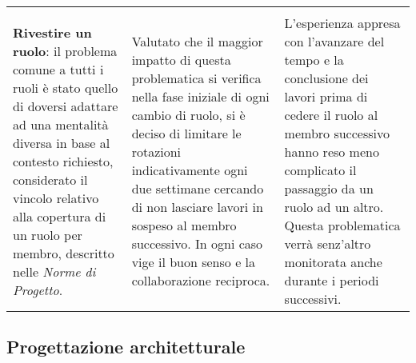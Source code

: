 \begin{longtable}{ 
				>{\centering}p{}
				>{\centering}p{}
				>{\centering\arraybackslash}p{}}
				\multicolumn{3}{c}{Ruoli} \\
				\textbf{Rivestire un ruolo}: il problema comune a tutti i ruoli è stato quello di doversi adattare ad una mentalità diversa in base al contesto richiesto, considerato il vincolo relativo alla copertura di un ruolo per membro, descritto nelle \textit{Norme di Progetto}.
					&
				Valutato che il maggior impatto di questa problematica si verifica nella fase iniziale di ogni cambio di ruolo, si è deciso di limitare le rotazioni indicativamente ogni due settimane cercando di non lasciare lavori in sospeso al membro successivo. In ogni caso vige il buon senso e la collaborazione reciproca.
					&
				L'esperienza appresa con l'avanzare del tempo e la conclusione dei lavori prima di cedere il ruolo al membro successivo hanno reso meno complicato il passaggio da un ruolo ad un altro. Questa problematica verrà senz'altro monitorata anche durante i periodi successivi.
					\\
				
			\end{longtable}
	
	\subsection{Progettazione architetturale}
	
